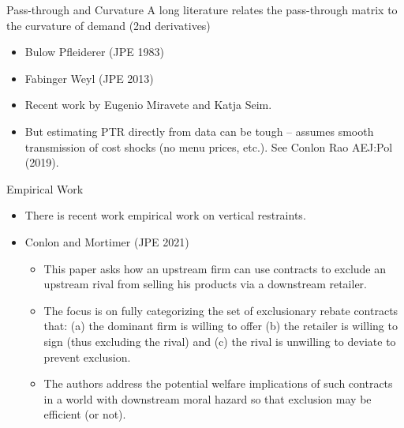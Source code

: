 \begin{frame}{Pass-through and Curvature}
A long literature relates the pass-through matrix to the curvature of demand (2nd derivatives)
\begin{itemize}
\item Bulow Pfleiderer (JPE 1983)
\item Fabinger Weyl (JPE 2013)
\item Recent work by Eugenio Miravete and Katja Seim.
\item But estimating PTR directly from data can be tough -- assumes smooth transmission of cost shocks (no menu prices, etc.). See Conlon Rao AEJ:Pol (2019).
  \end{itemize}
\end{frame}




\begin{frame}{Empirical Work}
\begin{itemize}
\item There is recent work empirical work on \alert{vertical restraints}.
\item Conlon and Mortimer (JPE 2021)
\begin{itemize}
\item This paper asks how an \alert{upstream firm} can use contracts to \alert{exclude} an upstream rival from selling his products via a downstream retailer.
\item The focus is on fully categorizing the set of exclusionary rebate contracts that: (a) the dominant firm is willing to offer (b) the retailer is willing to sign (thus excluding the rival) and (c) the rival is unwilling to deviate to prevent exclusion.
\item The authors address the potential welfare implications of such contracts in a world with \alert{downstream moral hazard} so that exclusion may be efficient (or not).
\end{itemize}
\end{itemize}
\end{frame}


